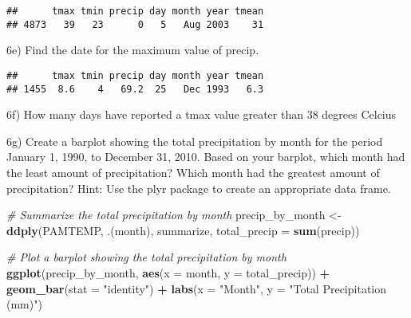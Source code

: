 \documentclass[
]{article}
\newenvironment{Shaded}{\begin{snugshade}}{\end{snugshade}}
\newcommand{\AttributeTok}[1]{\textcolor[rgb]{0.13,0.29,0.53}{#1}}
\newcommand{\CommentTok}[1]{\textcolor[rgb]{0.56,0.35,0.01}{\textit{#1}}}
\newcommand{\DecValTok}[1]{\textcolor[rgb]{0.00,0.00,0.81}{#1}}
\newcommand{\FunctionTok}[1]{\textcolor[rgb]{0.13,0.29,0.53}{\textbf{#1}}}
\newcommand{\NormalTok}[1]{#1}
\newcommand{\OtherTok}[1]{\textcolor[rgb]{0.56,0.35,0.01}{#1}}
\newcommand{\SpecialCharTok}[1]{\textcolor[rgb]{0.81,0.36,0.00}{\textbf{#1}}}
\newcommand{\StringTok}[1]{\textcolor[rgb]{0.31,0.60,0.02}{#1}}
\begin{document}
\begin{verbatim}
##      tmax tmin precip day month year tmean
## 4873   39   23      0   5   Aug 2003    31
\end{verbatim}

6e) Find the date for the maximum value of precip.

\begin{Shaded}
\end{Shaded}

\begin{verbatim}
##      tmax tmin precip day month year tmean
## 1455  8.6    4   69.2  25   Dec 1993   6.3
\end{verbatim}

6f) How many days have reported a tmax value greater than 38 degrees
Celcius

\begin{Shaded}
\end{Shaded}

6g) Create a barplot showing the total precipitation by month for the
period January 1, 1990, to December 31, 2010. Based on your barplot,
which month had the least amount of precipitation? Which month had the
greatest amount of precipitation? Hint: Use the plyr package to create
an appropriate data frame.

\begin{Shaded}
\begin{Highlighting}[]
\CommentTok{\# Summarize the total precipitation by month}
\NormalTok{precip\_by\_month }\OtherTok{\textless{}{-}} \FunctionTok{ddply}\NormalTok{(PAMTEMP, .(month), summarize, }\AttributeTok{total\_precip =} \FunctionTok{sum}\NormalTok{(precip))}

\CommentTok{\# Plot a barplot showing the total precipitation by month}
\FunctionTok{ggplot}\NormalTok{(precip\_by\_month, }\FunctionTok{aes}\NormalTok{(}\AttributeTok{x =}\NormalTok{ month, }\AttributeTok{y =}\NormalTok{ total\_precip)) }\SpecialCharTok{+}
  \FunctionTok{geom\_bar}\NormalTok{(}\AttributeTok{stat =} \StringTok{"identity"}\NormalTok{) }\SpecialCharTok{+}
  \FunctionTok{labs}\NormalTok{(}\AttributeTok{x =} \StringTok{"Month"}\NormalTok{, }\AttributeTok{y =} \StringTok{"Total Precipitation (mm)"}\NormalTok{)}
\end{Highlighting}
\end{Shaded}
\end{document}
